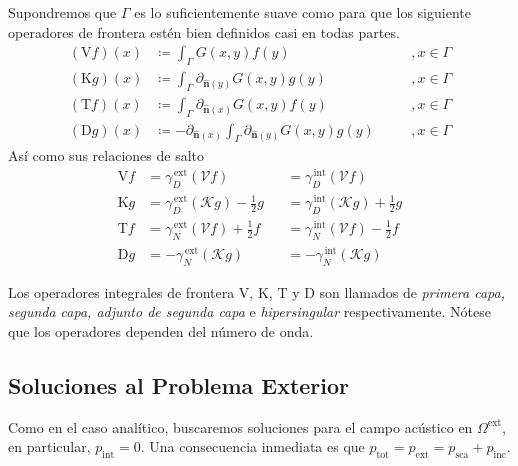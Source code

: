 \documentclass[11pt]{article}
\numberwithin{equation}{section}
\def\n{\hat{\textbf{n}}}
\def\Slpot{\mathcal{V}}
\def\Dlpot{\mathcal{K}}
\def\Slop{\mathrm{V}}
\def\Dlop{\mathrm{K}}
\def\Adlop{\mathrm{T}}
\def\Hop{\mathrm{D}}
\def\traceN{\gamma_{N}}
\def\traceD{\gamma_{D}}
\def\tot{\textrm{tot}}
\def\exterior{\textrm{ext}}
\def\interior{\textrm{int}}
\def\inc{\textrm{inc}}
\def\sca{\textrm{sca}}
\begin{document}
Supondremos que \(\Gamma\) es lo suficientemente suave como para que los
siguiente operadores de frontera estén bien definidos casi en todas partes.
\begin{subequations}\label{operadores integrales de frontera}
\begin{alignat}{4}
\label{op:int:sl}
	(\Slop f)(x) &\coloneqq \int_{\Gamma} G(x,y) f(y)
	&\quad&, x\in \Gamma\\
\label{op:int:dl}
	(\Dlop g )(x) &\coloneqq \int_{\Gamma} \partial_{\n(y)} G(x,y) g(y)
	&\quad&, x\in \Gamma\\
\label{op:int:adl}
	(\Adlop f)(x) &\coloneqq \int_{\Gamma} \partial_{\n(x)} G(x,y) f(y)
	&\quad&, x\in \Gamma\\
\label{op:int:h}
	(\Hop g )(x) &\coloneqq -\partial_{\n(x)} \int_{\Gamma} \partial_{\n(y)} G(x,y) g(y)
	&\quad&, x\in \Gamma
\end{alignat}
\end{subequations}
Así como sus relaciones de salto
\begin{subequations}\label{relaciones de salto}
\begin{alignat}{4}
	\Slop f
	&= \traceD^{\,\exterior} \left(\Slpot f\right)
	&&= \traceD^{\,\interior} \left(\Slpot f\right)
	\\
	\Dlop g
	&= \traceD^{\,\exterior} \left(\Dlpot g\right) - \frac{1}{2}g
	&&= \traceD^{\,\interior} \left(\Dlpot g\right) + \frac{1}{2}g
	\\
	\Adlop f
	&= \traceN^{\,\exterior} \left(\Slpot f\right) + \frac{1}{2}f
	&&= \traceN^{\,\interior} \left(\Slpot f\right) - \frac{1}{2}f
	\\
	\Hop g
	&= -\traceN^{\,\exterior} \left( \Dlpot g \right)
	&&= -\traceN^{\,\interior} \left( \Dlpot g \right)
\end{alignat}
\end{subequations}

Los operadores integrales de frontera \(\Slop\), \(\Dlop\), \(\Adlop\) y \(\Hop\) son llamados 
de \textit{primera capa, segunda capa, adjunto de segunda capa} e
\textit{hipersingular} respectivamente. Nótese que los operadores dependen del
número de onda. 

\subsection{Soluciones al Problema Exterior}
\label{ssec:bem:exterior}

Como en el caso analítico, buscaremos soluciones para el campo acústico en
\(\Omega^{\exterior}\), en particular, \(p_{\interior} = 0\). Una consecuencia
inmediata es que \(p_{\tot} = p_{\exterior} = p_{\sca} + p_{\inc}\).
\end{document}
